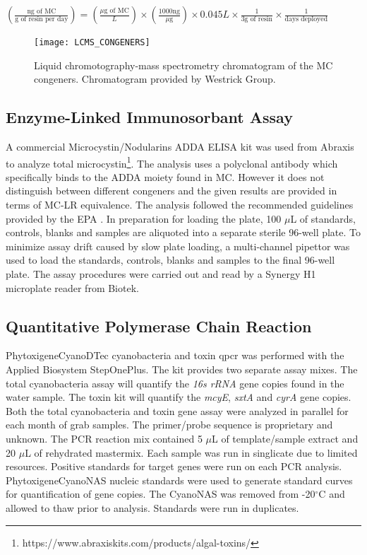 \begin {center} 
$(\frac{\text{ng of MC}}{\text{g of resin per day}}) =(\frac{\text{$\mu$g of MC}}{L}) \times (\frac{\text{1000ng}}{\text{$\mu$g}}) \times {0.045L} \times \frac{1}{\text{3g of resin}} \times \frac{1}{\text{days deployed}}$
\end{center}


\begin{figure}[!h]
\centering
\texttt{[image: LCMS\_CONGENERS]}
\caption{Liquid chromotography-mass spectrometry chromatogram of the MC congeners. Chromatogram provided by Westrick Group.}
\label{fig:spectra}
\end{figure}


\subsection{Enzyme-Linked Immunosorbant Assay}

A commercial Microcystin/Nodularins ADDA ELISA kit was used from Abraxis to analyze total microcystin\footnote{https://www.abraxiskits.com/products/algal-toxins/}. The analysis uses a polyclonal antibody which specifically binds to the ADDA moiety found in MC. However it does not distinguish between different congeners and the given results are provided in terms of MC-LR equivalence. The analysis followed the recommended guidelines provided by the EPA \cite{usepa_method_2016}. In preparation for loading the plate,  100 $\mu$L of standards, controls, blanks and samples are aliquoted into a separate sterile 96-well plate. To minimize assay drift caused by slow plate loading, a multi-channel pipettor was used to load the standards, controls, blanks and samples to the final 96-well plate. The assay procedures were carried out and read by a Synergy H1 microplate reader from Biotek.

\subsection{Quantitative Polymerase Chain Reaction}

Phytoxigene\texttrademark  CyanoDTec cyanobacteria and toxin \gls{qpcr} was performed with the Applied Biosystem StepOnePlus\texttrademark. The kit provides two separate assay mixes. The total cyanobacteria assay will quantify the \emph{16s rRNA} gene copies found in the water sample. The toxin kit will quantify the \emph{mcyE}, \emph{sxtA} and \emph{cyrA} gene copies.  Both the total cyanobacteria and toxin gene assay were analyzed in parallel for each month of grab samples. The primer/probe sequence is proprietary and unknown.  The PCR reaction mix contained 5 $\mu$L of template/sample extract and 20 $\mu$L of rehydrated mastermix.  Each sample was run in singlicate due to limited resources. Positive standards for target genes  were run on each PCR analysis. Phytoxigene\texttrademark  CyanoNAS nucleic standards were used to generate standard curves for quantification of gene copies. The CyanoNAS was removed from -20$^\circ$C and allowed to thaw prior to analysis.  Standards were run in duplicates.


